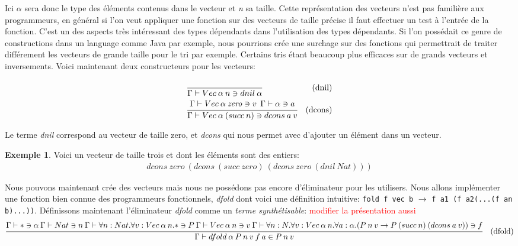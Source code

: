 \documentclass {article}
\theoremstyle{definition}
\newtheorem{example}{Exemple}
\theoremstyle{remark}
\newcommand{\todo}[1]{\textcolor{red}{#1}}
\newcommand{\fun}[1]{\lstinline!#1!}
\begin{document}
Ici $\alpha$ sera donc le type des éléments contenus dans le vecteur et \emph{n} sa taille. 
Cette représentation des vecteurs n'est pas familière aux programmeurs, en général si l'on veut appliquer une fonction sur des vecteurs 
de taille précise il faut effectuer un test à l'entrée de la fonction. C'est un des aspects très intéressant des types dépendants dans 
l'utilisation des types dépendants. Si l'on possédait ce genre de constructions dans un language comme Java par exemple, nous
pourrions crée une surchage sur des fonctions qui permettrait de traiter différement les vecteurs de grande taille pour le tri par exemple.
Certains tris étant beaucoup plus efficaces sur de grands vecteurs et inversements. 
Voici maintenant deux constructeurs pour les vecteurs:
\begin{align*}
  &\cfrac{}
  {\Gamma\vdash Vec\:\alpha\:n\ni dnil\:\alpha}&\mbox{(dnil)} \\
  &\cfrac{\Gamma\vdash Vec\:\alpha\:\mathit{zero}\ni v \:\:\Gamma\vdash \alpha\ni a}
  {\Gamma\vdash Vec\:\alpha\:(succ\:n)\ni dcons\:a\:v}&\mbox{(dcons)} \\
\end{align*}

Le terme \emph{dnil} correspond au vecteur de taille zero, et \emph{dcons} qui nous permet avec d'ajouter un élément dans un vecteur.
\begin{example}
  Voici un vecteur de taille trois et dont les éléments sont des entiers:
  \begin{align*}
    dcons\:zero\:(dcons\:(succ\:zero)\:(dcons\:zero\:(dnil\:Nat)))
  \end{align*}  
\end{example}

Nous pouvons maintenant crée des vecteurs mais nous ne possédons pas encore d'éliminateur pour les utilisers. Nous allons 
implémenter une fonction bien connue des programmeurs fonctionnels, \emph{dfold} dont voici une définition intuitive:
\fun{fold f vec b} $\rightarrow$ \fun{f a1 (f a2(...(f an b)...))}.
Définissons maintenant l'éliminateur \emph{dfold} comme un \emph{terme synthétisable}:
\todo{modifier la présentation aussi}
\begin{align*}
  &\cfrac{\Gamma\vdash *\ni\alpha\:
    \Gamma\vdash Nat \ni n \: 
    \Gamma\vdash \forall n:Nat.\forall v:Vec\:\alpha\:n.*\ni P\:
    \Gamma\vdash Vec\:\alpha\:n\ni v\:
    \Gamma\vdash \forall n:N.\forall v:Vec\:\alpha\:n.\forall a:\alpha.(P\:n\:v\rightarrow P\:(succ\:n)\:(dcons\:a\:v))\ni f}
  {\Gamma\vdash dfold\:\alpha\:P\:n\:v\:f\:a\in P\:n\:v}&\mbox{(dfold)}
\end{align*}
\end{document}
